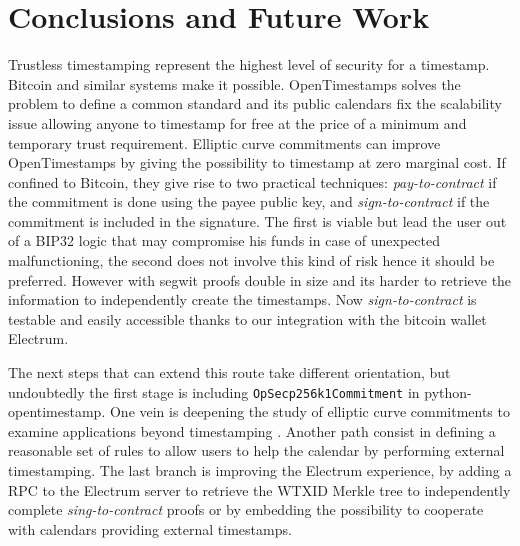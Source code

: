 \chapter{Conclusions and Future Work}
\label{chpr:conclusions}
Trustless timestamping represent the highest level of security for a timestamp. 
Bitcoin and similar systems make it possible.
OpenTimestamps solves the problem to define a common standard and its public calendars fix the scalability issue allowing anyone to timestamp for free at the price of a minimum and temporary trust requirement.
Elliptic curve commitments can improve OpenTimestamps by giving the possibility to timestamp at zero marginal cost. 
If confined to Bitcoin, they give rise to two practical techniques: \textit{pay-to-contract} if the commitment is done using the payee public key, and \textit{sign-to-contract} if the commitment is included in the signature. 
The first is viable but lead the user out of a BIP32 logic that may compromise his funds in case of unexpected malfunctioning, the second does not involve this kind of risk hence it should be preferred. 
However with segwit proofs double in size and its harder to retrieve the information to independently create the timestamps.
Now \textit{sign-to-contract} is testable and easily accessible thanks to our integration with the bitcoin wallet Electrum.

The next steps that can extend this route take different orientation, but undoubtedly the first stage is including \verb|OpSecp256k1Commitment| in python-opentimestamp.
One vein is deepening the study of elliptic curve commitments to examine applications beyond timestamping \cite{TapRoot}.
Another path consist in defining a reasonable set of rules to allow users to help the calendar by performing external timestamping.
The last branch is improving the Electrum experience, by adding a RPC to the Electrum server to retrieve the WTXID Merkle tree to independently complete \textit{sing-to-contract} proofs or by embedding the possibility to cooperate with calendars providing external timestamps.
